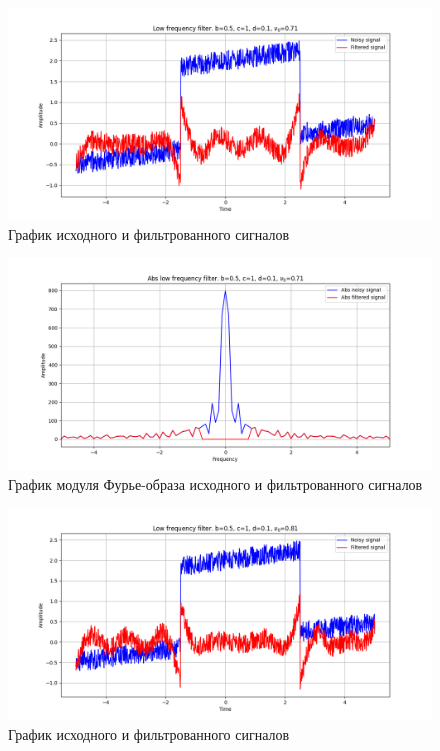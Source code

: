 \documentclass[a4paper, 12pt]{article}
\begin{document}
    \begin{figure}[!htb]
        \centering
        \includegraphics[scale=0.485]{7_u_flt_u_nolow.png}
        \captionsetup{skip=0pt}
        \caption{График исходного и фильтрованного сигналов}
        \label{fig:fig39}
    \end{figure}
    \begin{figure}[!htb]
        \centering
        \includegraphics[scale=0.485]{7_abs_u_U_nolow.png}
        \captionsetup{skip=0pt}
        \caption{График модуля Фурье-образа исходного и фильтрованного сигналов}
        \label{fig:fig40}
    \end{figure}
    \begin{figure}[!htb]
        \centering
        \includegraphics[scale=0.485]{8_u_flt_u_nolow.png}
        \captionsetup{skip=0pt}
        \caption{График исходного и фильтрованного сигналов}
        \label{fig:fig41}
    \end{figure}
\end{document}
